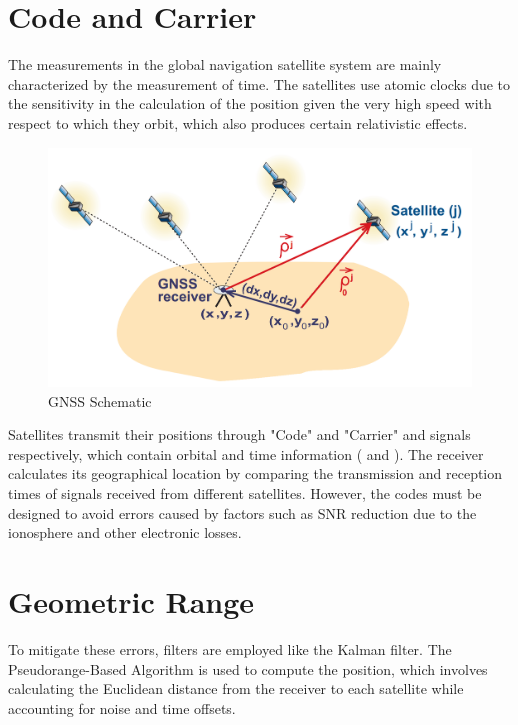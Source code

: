 \section{Code and Carrier}

The measurements in the global navigation satellite system are mainly characterized by the measurement of time. The satellites use atomic clocks due to the sensitivity in the calculation of the position given the very high speed with respect to which they orbit, which also produces certain relativistic effects.\\

\begin{figure}[H]
        \centering
        \includegraphics[scale=0.27]{sources/Figures/GNSS_Scheme.png}
        \caption{GNSS Schematic}
        \label{fig:radio magnetic}
\end{figure}


Satellites transmit their positions through "Code" and "Carrier"   and  signals respectively, which contain orbital and time information ( and ). The receiver calculates its geographical location by comparing the transmission and reception times of signals received from different satellites. However, the codes must be designed to avoid errors caused by factors such as SNR  reduction due to the ionosphere and other electronic losses.

\section{Geometric Range}

To mitigate these errors, filters are employed like the Kalman filter. The Pseudorange-Based Algorithm is used to compute the position, which involves calculating the Euclidean distance from the receiver to each satellite while accounting for noise and time offsets. 

